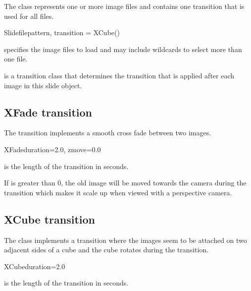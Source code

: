 The  class represents one or more image files and contains
one transition that is used for all files.

\begin{classdesc}{Slide}{filepattern, transition = XCube()}

 specifies the image files to load and may include
wildcards to select more than one file.

 is a transition class that determines the transition
that is applied after each image in this slide object.
\end{classdesc}

\subsection{XFade transition}

The  transition implements a smooth cross fade between two
images.

\begin{classdesc}{XFade}{duration=2.0, zmove=0.0}

 is the length of the transition in seconds.

If  is greater than 0, the old image will be moved towards
the camera during the transition which makes it scale up when viewed
with a perspective camera.
\end{classdesc}

\subsection{XCube transition}

The  class implements a transition where the images seem
to be attached on two adjacent sides of a cube and the cube rotates
during the transition.

\begin{classdesc}{XCube}{duration=2.0}

 is the length of the transition in seconds.
\end{classdesc}

